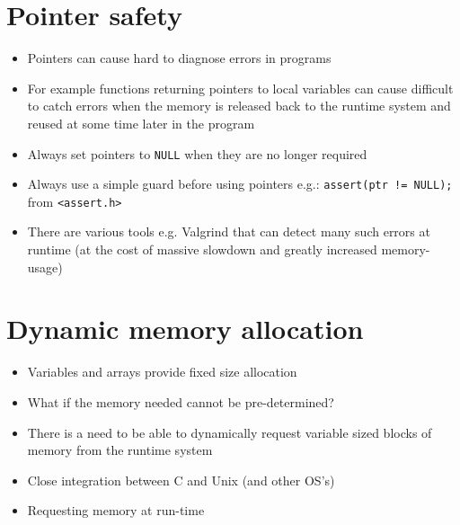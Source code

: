 \documentclass{article}
\begin{document}
\section{Pointer safety}
\begin{itemize}
\item Pointers can cause hard to diagnose errors in programs

\item For example functions returning pointers to local variables can cause difficult to catch errors when the memory is released back to the runtime system and reused at some time later in the program

\item Always set pointers to \verb!NULL! when they are no longer required

\item Always use a simple guard before using pointers e.g.:
\verb~assert(ptr != NULL);~ from \verb!<assert.h>!

\item There are various tools e.g. Valgrind that can detect many such errors at runtime (at the cost of massive slowdown and greatly increased memory-usage)
\end{itemize}



\section{Dynamic memory allocation}


\begin{itemize}
\item Variables and arrays provide fixed size allocation
\item What if the memory needed cannot be pre-determined?
\item There is a need to be able to dynamically request variable sized blocks of memory from the runtime system
\item Close integration between C and Unix (and other OS's)
\item Requesting memory at run-time
\end{itemize}
\end{document}
